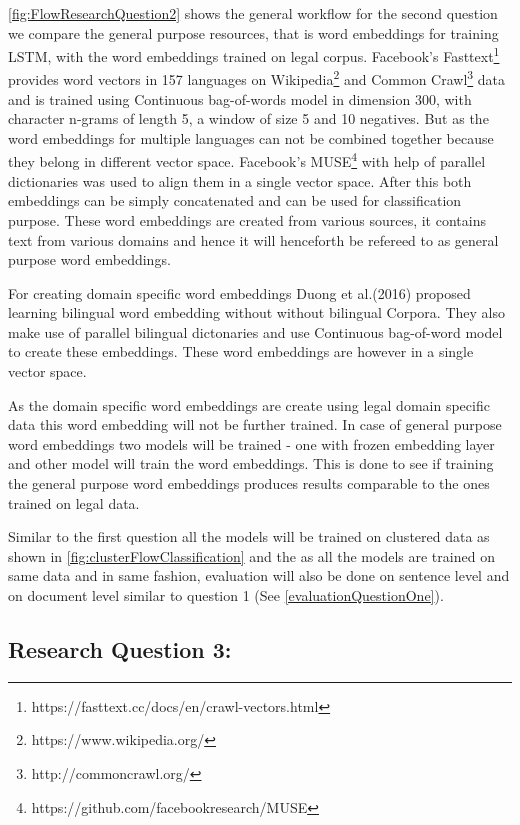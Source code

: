 \ref{fig:FlowResearchQuestion2} shows the general workflow for the second question we compare the general purpose resources, that is word embeddings for training LSTM, with the word embeddings trained on legal corpus. Facebook's Fasttext\footnote{https://fasttext.cc/docs/en/crawl-vectors.html}\cite{graves2009novel} provides word vectors in 157 languages on Wikipedia\footnote{https://www.wikipedia.org/} and Common Crawl\footnote{http://commoncrawl.org/} data and is trained using Continuous bag-of-words model in dimension 300, with character n-grams of length 5, a window of size 5 and 10 negatives. But as the word embeddings for multiple languages can not be combined together because they belong in different vector space. Facebook's MUSE\footnote{https://github.com/facebookresearch/MUSE} \cite{conneau2017word} with help of parallel dictionaries was used to align them in a single vector space. After this both embeddings can be simply concatenated and can be used for classification purpose. These word embeddings are created from various sources, it contains text from various domains and hence it will henceforth be refereed to as general purpose word embeddings.

For creating domain specific word embeddings Duong et al.(2016)\cite{duong-EtAl:2016:EMNLP} proposed learning bilingual word embedding without without bilingual Corpora\cite{duong-EtAl:2016:EMNLP}. They also make use of parallel bilingual dictonaries and use Continuous bag-of-word model to create these embeddings. These word embeddings are however in a single vector space.

As the domain specific word embeddings are create using legal domain specific data this word embedding will not be further trained. In case of general purpose word embeddings two models will be trained - one with frozen embedding layer and other model will train the word embeddings. This is done to see if training the general purpose word embeddings produces results comparable to the ones trained on legal data.

Similar to the first question all the models will be trained on clustered data as shown in \ref{fig:clusterFlowClassification} and the as all the models are trained on same data and in same fashion, evaluation will also be done on sentence level and on document level similar to question 1 (See \ref{evaluationQuestionOne}).

\subsection{Research Question 3:} \label{question3}

